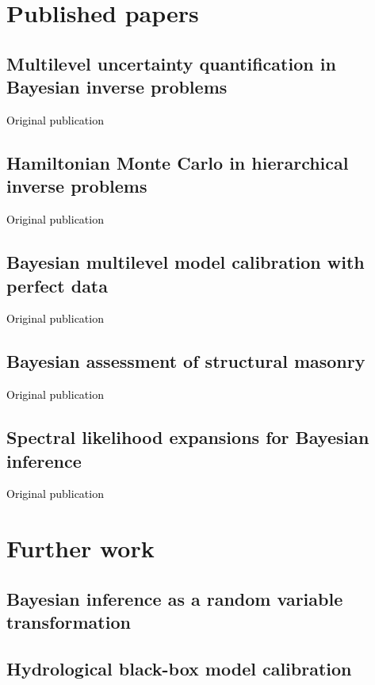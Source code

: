 \documentclass[a4paper,10pt,twoside]{book}                                                      %
\newcommand{\PublishedAs}[1]{\vspace{-2.5ex}\noindent\textcolor{black}{Original publication\\[1ex]{#1}}\vspace{2.5ex}}
\begin{document}
\part{Published papers} \label{sec:Published}

\chapter{Multilevel uncertainty quantification in Bayesian inverse problems} \label{sec:PEM}
\PublishedAs{}


\chapter{Hamiltonian Monte Carlo in hierarchical inverse problems} \label{sec:JRUES}
\PublishedAs{}


\chapter{Bayesian multilevel model calibration with perfect data} \label{sec:JAIS}
\PublishedAs{}


\chapter{Bayesian assessment of structural masonry} \label{sec:ICASP}
\PublishedAs{}


\chapter{Spectral likelihood expansions for Bayesian inference} \label{sec:JCP}
\PublishedAs{}


\part{Further work} \label{sec:Further}

\chapter{Bayesian inference as a random variable transformation} \label{sec:Transport}


\chapter{Hydrological black-box model calibration} \label{sec:Hydrology}

\end{document}
